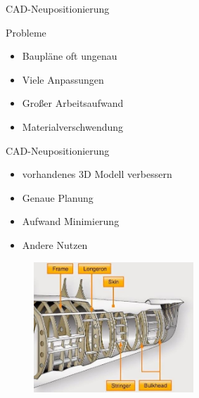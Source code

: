 \begin{frame}{CAD-Neupositionierung}
    \begin{minipage}[]{0.5\textwidth}
    \begin{block}{Probleme}
        \begin{itemize}
            \item Baupläne oft ungenau
            \item Viele Anpassungen
            \item Großer Arbeitsaufwand
            \item Materialverschwendung
        \end{itemize}
    \end{block}
    \begin{block}{CAD-Neupositionierung}
        \begin{itemize}
            \item vorhandenes 3D Modell verbessern
            \item Genaue Planung
            \item Aufwand Minimierung
            \item Andere Nutzen
        \end{itemize}
    \end{block}
    \end{minipage}
    \begin{minipage}[]{0.49\textwidth}
      \begin{figure}
          \includegraphics[width=170pt]{img_niklas/frame_Stringer.jpg}
      \end{figure}
    \end{minipage}
\end{frame}


